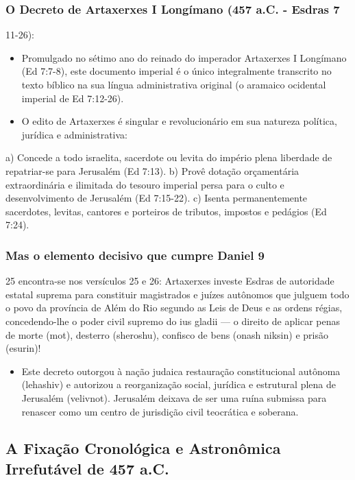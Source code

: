 \documentclass[11pt,a4paper,openany]{book}
\begin{document}
\subsubsection*{O Decreto de Artaxerxes I Longímano (457 a.C. - Esdras 7}
11-26):
\begin{itemize}
  \item Promulgado no sétimo ano do reinado do imperador Artaxerxes I Longímano (Ed 7:7-8), este documento imperial é o único integralmente transcrito no texto bíblico na sua língua administrativa original (o aramaico ocidental imperial de Ed 7:12-26).
  \item O edito de Artaxerxes é singular e revolucionário em sua natureza política, jurídica e administrativa:
\end{itemize}

a) Concede a todo israelita, sacerdote ou levita do império plena liberdade de repatriar-se para Jerusalém (Ed 7:13).
b) Provê dotação orçamentária extraordinária e ilimitada do tesouro imperial persa para o culto e desenvolvimento de Jerusalém (Ed 7:15-22).
c) Isenta permanentemente sacerdotes, levitas, cantores e porteiros de tributos, impostos e pedágios (Ed 7:24).

\subsubsection*{Mas o elemento decisivo que cumpre Daniel 9}
25 encontra-se nos versículos 25 e 26: Artaxerxes investe Esdras de autoridade estatal suprema para constituir magistrados e juízes autônomos que julguem todo o povo da província de Além do Rio segundo as Leis de Deus e as ordens régias, concedendo-lhe o poder civil supremo do ius gladii — o direito de aplicar penas de morte (mot), desterro (sheroshu), confisco de bens (onash niksin) e prisão (esurin)!
\begin{itemize}
  \item Este decreto outorgou à nação judaica restauração constitucional autônoma (lehashiv) e autorizou a reorganização social, jurídica e estrutural plena de Jerusalém (velivnot). Jerusalém deixava de ser uma ruína submissa para renascer como um centro de jurisdição civil teocrática e soberana.
\end{itemize}




\subsection{A Fixação Cronológica e Astronômica Irrefutável de 457 a.C.}
\end{document}
